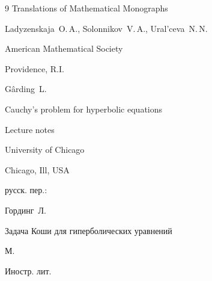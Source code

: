 \begin{thebibliography}{9}
\serial Translations of Mathematical Monographs


\by Ladyzenskaja~O.\,A., Solonnikov~V.\,A.,  Ural'ceva~N.\,N.


\publ American Mathematical Society


\publaddr Providence, R.I.







\by G\^arding~L.

\book  Cauchy's problem for hyperbolic equations

\serial Lecture notes

\publ University of Chicago


\publaddr Chicago, Ill, USA

\rtransl русск. пер.:~

\by Гординг~Л.

\book Задача Коши для гиперболических уравнений

\publaddr М.

\publ Иностр. лит.





\end{thebibliography}



\noindent

\hskip6.5cm \thedate \par\noindent

\hskip6.5cm\therevdate\par





\bigskip



\makeengtitle



\newpage



\newpage



%

